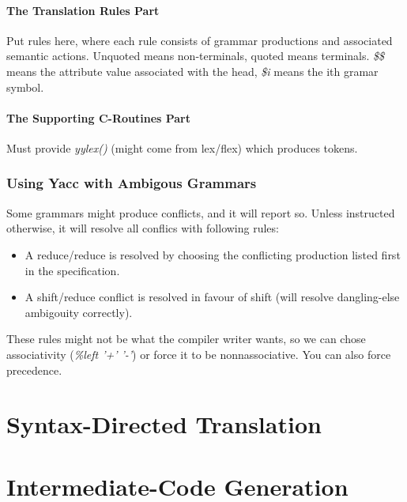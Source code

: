 \documentclass{article}
\begin{document}
\paragraph{The Translation Rules Part} %
\label{par:The Translation Rules Part}
Put rules here, where each rule consists of grammar productions and associated semantic actions. Unquoted means non-terminals, quoted means terminals. \emph{\$\$} means the attribute value associated with the head, \emph{\$i} means the ith gramar symbol.
\paragraph{The Supporting C-Routines Part} %
\label{par:The Supporting C-Routines Part}
Must provide \emph{yylex()} (might come from lex/flex) which produces tokens.

\subsubsection{Using Yacc with Ambigous Grammars} %
\label{ssub:Using Yacc with Ambigous Grammars}
Some grammars might produce conflicts, and it will report so. Unless instructed otherwise, it will resolve all conflics with following rules:
\begin{itemize}
	\item A reduce/reduce is resolved by choosing the conflicting production listed first in the specification.
	\item A shift/reduce conflict is resolved in favour of shift (will resolve dangling-else ambigouity correctly).
\end{itemize}
These rules might not be what the compiler writer wants, so we can chose associativity (\emph{\%left '+' '-'}) or force it to be nonnassociative. You can also force precedence.

\section{Syntax-Directed Translation} %
\label{sec:Syntax-Directed Translation}


\section{Intermediate-Code Generation} %
\label{sec:Intermediate-Code Generation}
\end{document}
